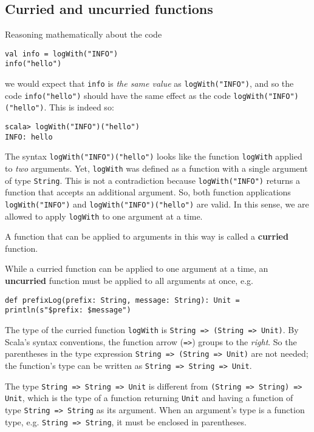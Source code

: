 \subsection{Curried and uncurried functions}

Reasoning mathematically about the code
\begin{lstlisting}
val info = logWith("INFO")
info("hello")
\end{lstlisting}
we would expect that \lstinline!info! is \emph{the same value} as
\lstinline!logWith("INFO")!, and so the code \lstinline!info("hello")!
should have the same effect as the code \lstinline!logWith("INFO")("hello")!.
This is indeed so:
\begin{lstlisting}
scala> logWith("INFO")("hello")
INFO: hello
\end{lstlisting}
The syntax \lstinline!logWith("INFO")("hello")! looks like the function
\lstinline!logWith! applied to \emph{two} arguments. Yet, \lstinline!logWith!
was defined as a function with a single argument of type \lstinline!String!.
This is not a contradiction because \lstinline!logWith("INFO")! returns
a function that accepts an additional argument. So, both function
applications \lstinline!logWith("INFO")! and \lstinline!logWith("INFO")("hello")!
are valid. In this sense, we are allowed to apply \lstinline!logWith!
to one argument at a time.

A function that can be applied to arguments in this way is called
a \textbf{curried} function. 

While a curried function can be applied to one argument at a time,
an \textbf{uncurried} function must be
applied to all arguments at once, e.g.
\begin{lstlisting}
def prefixLog(prefix: String, message: String): Unit = println(s"$prefix: $message")
\end{lstlisting}

The type of the curried function \lstinline!logWith! is \lstinline!String => (String => Unit)!.
By Scala's syntax conventions, the function arrow (\lstinline!=>!)
groups to the \emph{right}. So the parentheses in the type expression
\lstinline!String => (String => Unit)! are not needed; the function's
type can be written as \lstinline!String => String => Unit!.

The type \lstinline!String => String => Unit! is different from \lstinline!(String => String) => Unit!,
which is the type of a function returning \lstinline!Unit! and having
a function of type \lstinline!String => String! as its argument.
When an argument's type is a function type, e.g. \lstinline!String => String!,
it must be enclosed in parentheses.

